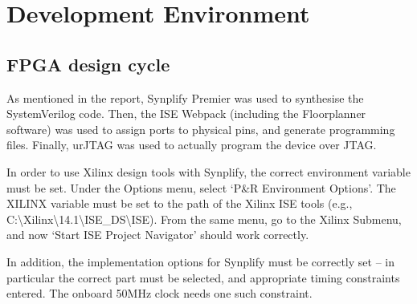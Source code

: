 \chapter{Development Environment} %
\label{apdx:development_environment}


\section{FPGA design cycle} %
\label{apdx:fpga_design_cycle}
	As mentioned in the report, Synplify Premier was used to synthesise the SystemVerilog code.  Then, the ISE Webpack (including the Floorplanner software) was used to assign ports to physical pins, and generate programming files.  Finally, urJTAG was used to actually program the device over JTAG.

	In order to use Xilinx design tools with Synplify, the correct environment variable must be set.  Under the Options menu, select `P\&R Environment Options'.  The XILINX variable must be set to the path of the Xilinx ISE tools (e.g., C:\textbackslash Xilinx\textbackslash 14.1\textbackslash ISE\_DS\textbackslash ISE).  From the same menu, go to the Xilinx Submenu, and now `Start ISE Project Navigator' should work correctly.

	In addition, the implementation options for Synplify must be correctly set -- in particular the correct part must be selected, and appropriate timing constraints entered.  The onboard 50MHz clock needs one such constraint.

